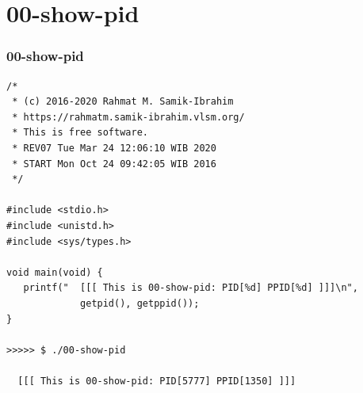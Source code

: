 \documentclass[aspectratio=169, xcolor=table, notheorems, hyperref={pdfpagelabels=false}]{beamer}
\begin{document}
\section{00-show-pid}
\begin{frame}[fragile]
\frametitle{00-show-pid}
\begin{lstlisting}[basicstyle=\ttfamily\footnotesize]
/*
 * (c) 2016-2020 Rahmat M. Samik-Ibrahim
 * https://rahmatm.samik-ibrahim.vlsm.org/
 * This is free software.
 * REV07 Tue Mar 24 12:06:10 WIB 2020
 * START Mon Oct 24 09:42:05 WIB 2016
 */

#include <stdio.h>
#include <unistd.h>
#include <sys/types.h>

void main(void) {
   printf("  [[[ This is 00-show-pid: PID[%d] PPID[%d] ]]]\n",
             getpid(), getppid());
}

>>>>> $ ./00-show-pid

  [[[ This is 00-show-pid: PID[5777] PPID[1350] ]]]

\end{lstlisting}
\end{frame}

\end{document}
